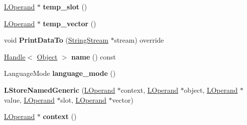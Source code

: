 \begin{DoxyCompactItemize}
\item 
\hyperlink{classv8_1_1internal_1_1_l_operand}{L\+Operand} $\ast$ {\bfseries temp\+\_\+slot} ()\hypertarget{classv8_1_1internal_1_1_l_store_named_generic_a18a6a60e809a89d7846e671670701c0d}{}\label{classv8_1_1internal_1_1_l_store_named_generic_a18a6a60e809a89d7846e671670701c0d}

\item 
\hyperlink{classv8_1_1internal_1_1_l_operand}{L\+Operand} $\ast$ {\bfseries temp\+\_\+vector} ()\hypertarget{classv8_1_1internal_1_1_l_store_named_generic_a128a00fb66f92d2aafae55ae0b99b887}{}\label{classv8_1_1internal_1_1_l_store_named_generic_a128a00fb66f92d2aafae55ae0b99b887}

\item 
void {\bfseries Print\+Data\+To} (\hyperlink{classv8_1_1internal_1_1_string_stream}{String\+Stream} $\ast$stream) override\hypertarget{classv8_1_1internal_1_1_l_store_named_generic_a71e5fdb3cd3c873fcaace82fa3a0291b}{}\label{classv8_1_1internal_1_1_l_store_named_generic_a71e5fdb3cd3c873fcaace82fa3a0291b}

\item 
\hyperlink{classv8_1_1internal_1_1_handle}{Handle}$<$ \hyperlink{classv8_1_1internal_1_1_object}{Object} $>$ {\bfseries name} () const \hypertarget{classv8_1_1internal_1_1_l_store_named_generic_a0fcb3f4bcaad0355374c20f5f3d215ab}{}\label{classv8_1_1internal_1_1_l_store_named_generic_a0fcb3f4bcaad0355374c20f5f3d215ab}

\item 
Language\+Mode {\bfseries language\+\_\+mode} ()\hypertarget{classv8_1_1internal_1_1_l_store_named_generic_a9aaa8911322a00bb960fa5f3e132ee3c}{}\label{classv8_1_1internal_1_1_l_store_named_generic_a9aaa8911322a00bb960fa5f3e132ee3c}

\item 
{\bfseries L\+Store\+Named\+Generic} (\hyperlink{classv8_1_1internal_1_1_l_operand}{L\+Operand} $\ast$context, \hyperlink{classv8_1_1internal_1_1_l_operand}{L\+Operand} $\ast$object, \hyperlink{classv8_1_1internal_1_1_l_operand}{L\+Operand} $\ast$value, \hyperlink{classv8_1_1internal_1_1_l_operand}{L\+Operand} $\ast$slot, \hyperlink{classv8_1_1internal_1_1_l_operand}{L\+Operand} $\ast$vector)\hypertarget{classv8_1_1internal_1_1_l_store_named_generic_a5e3f7dd8c808499319eaac553c49aea7}{}\label{classv8_1_1internal_1_1_l_store_named_generic_a5e3f7dd8c808499319eaac553c49aea7}

\item 
\hyperlink{classv8_1_1internal_1_1_l_operand}{L\+Operand} $\ast$ {\bfseries context} ()\hypertarget{classv8_1_1internal_1_1_l_store_named_generic_ae430bd465f69e64a24f1f9f99a9c91ad}{}\label{classv8_1_1internal_1_1_l_store_named_generic_ae430bd465f69e64a24f1f9f99a9c91ad}


\end{DoxyCompactItemize}
